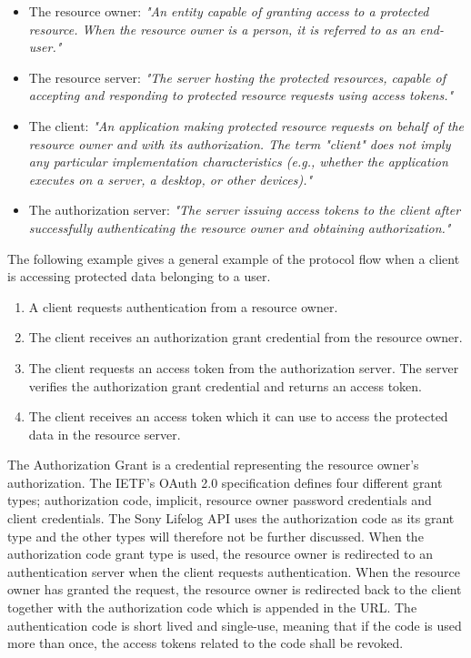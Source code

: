 \documentclass{cslthse-msc}
\begin{document}
\begin{itemize}
	\item The resource owner: \textit{"An entity capable of granting access to a protected resource. When the resource owner is a person, it is referred to as an end-user."}
	\item The resource server: \textit{"The server hosting the protected resources, capable of accepting and responding to protected resource requests using access tokens."}
	\item The client: \textit{"An application making protected resource requests on behalf of the resource owner and with its authorization. The term "client" does not imply any particular implementation characteristics (e.g., whether the application executes on a server, a desktop, or other devices)."}
	\item The authorization server: \textit{"The server issuing access tokens to the client after successfully authenticating the resource owner and obtaining authorization."}
\end{itemize}

The following example gives a general example of the protocol flow when a client is accessing protected data belonging to a user. 

\begin{enumerate}
	\item A client requests authentication from a resource owner. 
	\item The client receives an authorization grant credential from the resource owner.    
	\item The client requests an access token from the authorization server. The server verifies the authorization grant credential and returns an access token. 
	\item The client receives an access token which it can use to access the protected data in the resource server. 
\end{enumerate}

The Authorization Grant is a credential representing the resource owner's authorization. The IETF's OAuth 2.0 specification defines four different grant types; authorization code, implicit, resource owner password credentials and client credentials. The Sony Lifelog API uses the authorization code as its grant type and the other types will therefore not be further discussed\cite{LifeLogAuth}. When the authorization code grant type is used, the resource owner is redirected to an authentication server when the client requests authentication. When the resource owner has granted the request, the resource owner is redirected back to the client together with the authorization code which is appended in the URL. The authentication code is short lived and single-use, meaning that if the code is used more than once, the access tokens related to the code shall be revoked.
\end{document}
